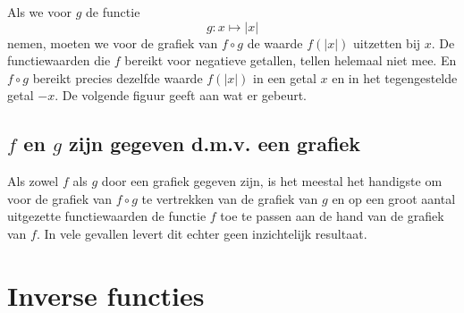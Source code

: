 \documentclass{ximera}
\begin{document}
Als we voor $g$ de functie
\[
g:x\mapsto |x|
\]
nemen, moeten we voor de grafiek van $f\circ g$ de waarde $f(|x|)$
uitzetten bij $x$. De functiewaarden die $f$ bereikt voor negatieve
getallen, tellen helemaal niet mee. En $f\circ g$ bereikt precies
dezelfde waarde $f(|x|)$ in een getal $x$ en in het tegengestelde
getal $-x$. De volgende figuur geeft aan wat er gebeurt. 

\begin{center}
\end{center}


\subsection{$f$ en $g$ zijn gegeven d.m.v. een grafiek}


Als zowel $f$ als $g$ door een grafiek gegeven zijn, is het meestal
het handigste om voor de grafiek van $f\circ g$ te vertrekken van de
grafiek van $g$ en op een groot aantal uitgezette functiewaarden de
functie $f$ toe te passen aan de hand van de grafiek van $f$. In vele
gevallen levert dit echter geen inzichtelijk resultaat.


\section{Inverse functies}
\label{secinv}
\end{document}
